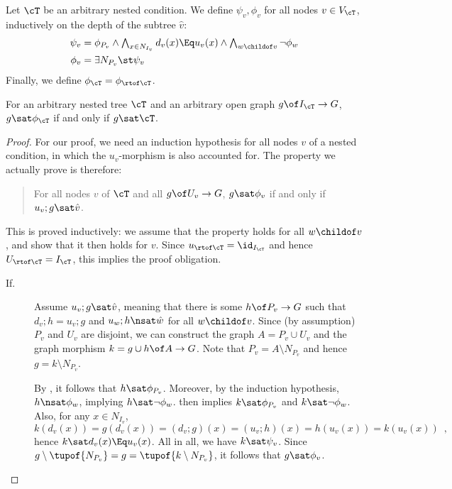 Let $\cT$ be an arbitrary nested condition. We define $\psi_v,\phi_v$ for all nodes $v\in V_\cT$, inductively on the depth of the subtree $\hat v$:
%
\begin{align}
\psi_v = {} & \textstyle \phi_{P_v}\wedge \bigwedge_{x\in N_{I_v}} d_v(x)\Eq u_v(x) \wedge \bigwedge_{w\childof v} \neg\phi_w \label{eq:psi} \\
\phi_v = {} & \exists N_{P_v}\st \psi_v
\end{align}
%
Finally, we define $\phi_\cT=\phi_{\rtof\cT}$.
%
\begin{theorem}
For an arbitrary nested tree $\cT$ and an arbitrary open graph $g\of I_\cT\to G$, $g\sat\phi_\cT$ if and only if $g\sat\cT$.
\end{theorem}
%
\begin{proof}
For our proof, we need an induction hypothesis for all nodes $v$ of a nested condition, in which the $u_v$-morphism is also accounted for. The property we actually prove is therefore:
\begin{quote}
For all nodes $v$ of $\cT$ and all $g\of U_v\to G$, $g\sat \phi_v$ if and only if $u_v;g\sat \hat v$.
\end{quote}
This is proved inductively: we assume that the property holds for all $w\childof v$, and show that it then holds for $v$. Since $u_{\rtof\cT}=\id_{I_\cT}$ and hence $U_{\rtof\cT}=I_\cT$, this implies the proof obligation.
%
\begin{description}
\item[If.] Assume $u_v;g\sat \hat v$, meaning that there is some $h\of P_v\to G$ such that $d_v;h=u_v;g$ and $u_w;h\nsat \hat w$ for all $w\childof v$. Since (by assumption) $P_v$ and $U_v$ are disjoint, we can construct the graph $A=P_v\cup U_v$ and the graph morphism $k=g\cup h\of A\to G$. Note that $P_v=A\setminus N_{P_v}$ and hence $g=k\setminus N_{P_v}$.

\smallskip
By , it follows that $h\sat \phi_{P_v}$. Moreover, by the induction hypothesis, $h\nsat \phi_w$, implying $h\sat\neg \phi_w$.  then implies $k\sat \phi_{P_v}$ and $k\sat \neg\phi_w$. Also, for any $x\in N_{I_v}$,
\[ k(d_v(x))=g(d_v(x))=(d_v;g)(x) = (u_v;h)(x) = h(u_v(x))=k(u_v(x)) \enspace, \]
hence $k\sat d_v(x)\Eq u_v(x)$. All in all, we have $k\sat \psi_v$. Since $g\setminus \tupof{N_{P_v}}= g= \tupof{k\setminus N_{P_v}}$, it follows that $g\sat \phi_v$.


\end{description}
\end{proof}
